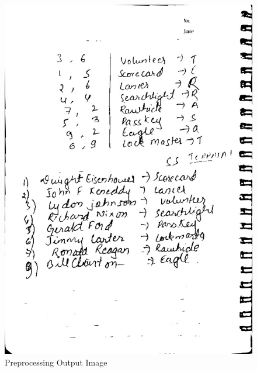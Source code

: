 \begin{enumerate}
\begin{figure}[h]
\begin{minipage}[b]{0.30\linewidth}
            \includegraphics[width=\linewidth]{output/output.jpg}
            \caption{Preprocessing Output Image}
        \end{minipage}
        

\end{figure}
\end{enumerate}
